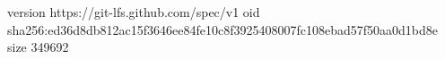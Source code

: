 version https://git-lfs.github.com/spec/v1
oid sha256:ed36d8db812ac15f3646ee84fe10c8f3925408007fc108ebad57f50aa0d1bd8e
size 349692
